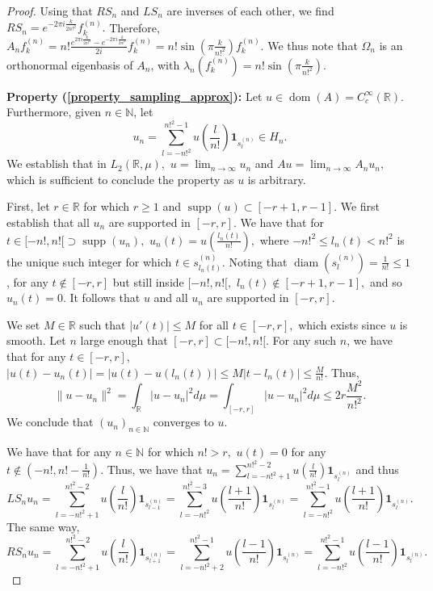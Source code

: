 \documentclass{amsart}
\theoremstyle{definition}
\theoremstyle{remark}
\def \Dom{\operatorname{dom}}
\begin{document}
\begin{proof}
	Using that $RS_n$ and $LS_n$ are inverses of each other, we find $RS_n=e^{-2\pi i\frac{k}{2n!^2}} f_k^{(n)}.$ Therefore, $A_nf_k^{(n)}=n!\frac{e^{2\pi i\frac{k}{2n!^2}}-e^{-2\pi i\frac{k}{2n!^2}}}{2i}f_k^{(n)}=n!\sin\left(\pi\frac{k}{n!^2}\right)f_k^{(n)}.$ We thus note that $\Omega_n$ is an orthonormal eigenbasis of $A_n$, with $\lambda_n(f_k^{(n)})=n!\sin\left(\pi\frac{k}{n!^2}\right).$
	
	\textbf{Property (\ref{property_sampling_approx}):} Let $u\in \Dom(A)=C_c^{\infty}(\mathbb{R}).$ Furthermore, given $n\in\mathbb{N}$, let $$u_n=\sum_{l=-n!^2}^{n!^2-1} u(\frac{l}{n!})\mathbf{1}_{s_l^{(n)}}\in H_n.$$ We establish that in $L_2(\mathbb{R},\mu),$ $u=\lim_{n\rightarrow\infty}u_n$ and $Au=\lim_{n\rightarrow\infty} A_nu_n,$ which is sufficient to conclude the property as $u$ is arbitrary.
	
	First, let $r\in\mathbb{R}$ for which $r\geq 1$ and $\operatorname{supp}(u)\subset [-r+1,r-1].$ We first establish that all $u_n$ are supported in $[-r,r].$ We have that for $t\in[-n!,n![\supset \operatorname{supp}(u_n),$ $u_n(t)=u(\frac{l_n(t)}{n!}),$ where $-n!^2\leq l_n(t)< n!^2$ is the unique such integer for which $t\in s_{l_n(t)}^{(n)}.$ Noting that $\operatorname{diam}(s_l^{(n)})=\frac{1}{n!}\leq 1$ , for any $t\notin [-r,r]$ but still inside $[-n!,n![,$ $l_n(t)\notin [-r+1,r-1],$ and so $u_n(t)=0.$ It follows that $u$ and all $u_n$ are supported in $[-r,r]$. 
	
	We set $M\in\mathbb{R}$ such that $|u'(t)|\leq M$ for all $t\in[-r,r],$ which exists since $u$ is smooth.  Let $n$ large enough that $[-r,r]\subset [-n!, n![.$ For any such $n$, we have that for any $t\in[-r,r]$, $|u(t)-u_n(t)|=|u(t)-u(l_n(t))|\leq M|t-l_n(t)|\leq\frac{M}{n!}.$ Thus, $$\|u-u_n\|^2=\int_{\mathbb{R}}|u-u_n|^2d\mu=\int_{[-r,r]}|u-u_n|^2d\mu\leq 2r\frac{M^2}{n!^2}.$$ We conclude that $(u_n)_{n\in\mathbb{N}}$ converges to $u$.
	
	We have that for any $n\in\mathbb{N}$ for which $n!>r,$ $u(t)=0$ for any $t\notin(-n!,n!-\frac{1}{n!}).$ Thus, we have that $u_n=\sum_{l=-n!^2+1}^{n!^2-2} u(\frac{l}{n!})\mathbf{1}_{s_l^{(n)}}$ and thus $$LS_nu_n=\sum_{l=-n!^2+1}^{n!^2-2} u(\frac{l}{n!})\mathbf{1}_{s_{l-1}^{(n)}}=\sum_{l=-n!^2}^{n!^2-3}u(\frac{l+1}{n!})\mathbf{1}_{s_l^{(n)}}=\sum_{l=-n!^2}^{n!^2-1}u(\frac{l+1}{n!})\mathbf{1}_{s_l^{(n)}}.$$ The same way, $$RS_nu_n=\sum_{l=-n!^2+1}^{n!^2-2} u(\frac{l}{n!})\mathbf{1}_{s_{l+1}^{(n)}}=\sum_{l=-n!^2+2}^{n!^2-1}u(\frac{l-1}{n!})\mathbf{1}_{s_l^{(n)}}=\sum_{l=-n!^2}^{n!^2-1}u(\frac{l-1}{n!})\mathbf{1}_{s_l^{(n)}}.$$
	

\end{proof}
\end{document}
